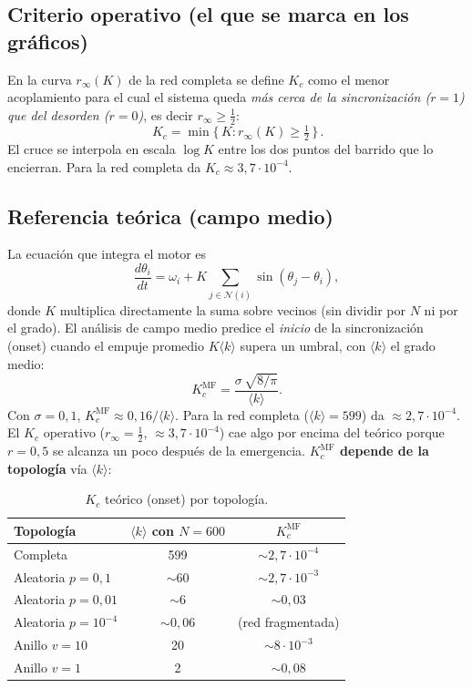 \documentclass[11pt,a4paper]{article}
\begin{document}
\subsection*{Criterio operativo (el que se marca en los gráficos)}

En la curva $r_\infty(K)$ de la red completa se define $K_c$ como el menor
acoplamiento para el cual el sistema queda \emph{más cerca de la sincronización
($r=1$) que del desorden ($r=0$)}, es decir $r_\infty \ge \tfrac{1}{2}$:
\[
  \boxed{\,K_c = \min\{\, K : r_\infty(K) \ge \tfrac{1}{2} \,\}\,}.
\]
El cruce se interpola en escala $\log K$ entre los dos puntos del barrido que lo
encierran. Para la red completa da $K_c \approx 3{,}7\cdot 10^{-4}$.

\subsection*{Referencia teórica (campo medio)}

La ecuación que integra el motor es
\[
  \frac{d\theta_i}{dt} = \omega_i + K \sum_{j \in \mathcal{N}(i)} \sin(\theta_j - \theta_i),
\]
donde $K$ multiplica directamente la suma sobre vecinos (sin dividir por $N$ ni
por el grado). El análisis de campo medio predice el \emph{inicio} de la
sincronización (onset) cuando el empuje promedio $K\langle k\rangle$ supera un
umbral, con $\langle k\rangle$ el grado medio:
\[
  K_c^{\text{MF}} = \frac{\sigma\,\sqrt{8/\pi}}{\langle k\rangle}.
\]
Con $\sigma = 0{,}1$, $K_c^{\text{MF}} \approx 0{,}16/\langle k\rangle$. Para la
red completa ($\langle k\rangle = 599$) da $\approx 2{,}7\cdot 10^{-4}$. El $K_c$
operativo ($r_\infty = \tfrac12$, $\approx 3{,}7\cdot 10^{-4}$) cae algo por
encima del teórico porque $r = 0{,}5$ se alcanza un poco después de la
emergencia. \textbf{$K_c^{\text{MF}}$ depende de la topología} vía $\langle k\rangle$:

\begin{table}[H]
  \centering
  \begin{tabular}{lcc}
    \toprule
    \textbf{Topología} & $\langle k \rangle$ con $N=600$ & $K_c^{\text{MF}}$ \\
    \midrule
    Completa            & 599        & $\sim 2{,}7\cdot 10^{-4}$ \\
    Aleatoria $p=0{,}1$ & $\sim 60$  & $\sim 2{,}7\cdot 10^{-3}$ \\
    Aleatoria $p=0{,}01$& $\sim 6$   & $\sim 0{,}03$ \\
    Aleatoria $p=10^{-4}$& $\sim 0{,}06$ & (red fragmentada) \\
    Anillo $v=10$       & 20         & $\sim 8\cdot 10^{-3}$ \\
    Anillo $v=1$        & 2          & $\sim 0{,}08$ \\
    \bottomrule
  \end{tabular}
  \caption{$K_c$ teórico (onset) por topología.}
\end{table}
\end{document}
